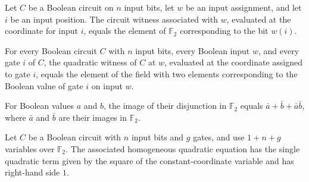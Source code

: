 \begin{theorem}
\label{FABL.BooleanCircuit.circuitQuadraticWitness_input}
\leanok
{}
Let $C$ be a Boolean circuit on $n$ input bits, let $w$ be an input assignment, and let
$i$ be an input position. The circuit witness associated with $w$, evaluated at the
coordinate for input $i$, equals the element of $\mathbb{F}_2$ corresponding to the bit
$w(i)$.
\end{theorem}

\begin{theorem}
\label{FABL.BooleanCircuit.circuitQuadraticWitness_gate}
\leanok
{}
For every Boolean circuit $C$ with $n$ input bits, every Boolean input $w$, and every
gate $i$ of $C$, the quadratic witness of $C$ at $w$, evaluated at the coordinate
assigned to gate $i$, equals the element of the field with two elements corresponding to
the Boolean value of gate $i$ on input $w$.
\end{theorem}

\begin{theorem}
\leanok
{}
For Boolean values $a$ and $b$, the image of their disjunction in $\mathbb{F}_2$ equals
$\bar a+\bar b+\bar a\bar b$, where $\bar a$ and $\bar b$ are their images in
$\mathbb{F}_2$.
\end{theorem}

\begin{definition}
\label{FABL.BooleanCircuit.circuitQuadraticConstantEquation}
\leanok
{}
Let $C$ be a Boolean circuit with $n$ input bits and $g$ gates, and use $1+n+g$
variables over $\mathbb{F}_2$. The associated homogeneous quadratic equation has the
single quadratic term given by the square of the constant-coordinate variable and has
right-hand side $1$.
\end{definition}


